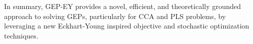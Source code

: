 In summary, GEP-EY provides a novel, efficient, and theoretically grounded approach to solving GEPs, particularly for CCA and PLS problems, by leveraging a new Eckhart-Young inspired objective and stochastic optimization techniques.





